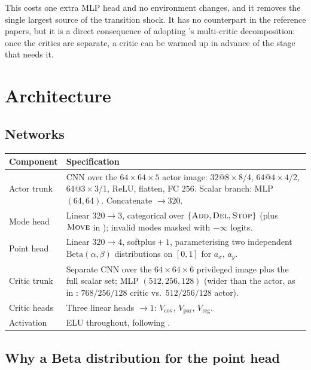 \documentclass[11pt,a4paper]{article}
\begin{document}
This costs one extra MLP head and no environment changes, and it removes the single largest
source of the transition shock. It has no counterpart in the reference papers, but it is a
direct consequence of adopting \citet{wang2025vision}'s multi-critic decomposition: once the
critics are separate, a critic can be warmed up in advance of the stage that needs it.

\section{Architecture}

\subsection{Networks}

\begin{center}
\small
\begin{tabularx}{\linewidth}{@{}l X@{}}
\toprule
\textbf{Component} & \textbf{Specification} \\
\midrule
Actor trunk   & CNN over the $64\times64\times5$ actor image: $32@8{\times}8$/4, $64@4{\times}4$/2, $64@3{\times}3$/1, ReLU, flatten, FC $256$. Scalar branch: MLP $(64,64)$. Concatenate $\to 320$. \\
Mode head     & Linear $320 \to 3$, categorical over $\{\textsc{Add},\textsc{Del},\textsc{Stop}\}$ (plus $\textsc{Move}$ in \stageIII{}); invalid modes masked with $-\infty$ logits. \\
Point head    & Linear $320 \to 4$, softplus${}+1$, parameterising two independent $\mathrm{Beta}(\alpha,\beta)$ distributions on $[0,1]$ for $a_x$, $a_y$. \\
Critic trunk  & Separate CNN over the $64\times64\times6$ privileged image plus the full scalar set; MLP $(512,256,128)$ (wider than the actor, as in \citet{wang2025dribble}: $768/256/128$ critic vs.\ $512/256/128$ actor). \\
Critic heads  & Three linear heads $\to 1$: $V_{\mathrm{cov}}$, $V_{\mathrm{par}}$, $V_{\mathrm{reg}}$. \\
Activation    & ELU throughout, following \citet{wang2025vision}. \\
\bottomrule
\end{tabularx}
\end{center}

\subsection{Why a Beta distribution for the point head}
\end{document}
